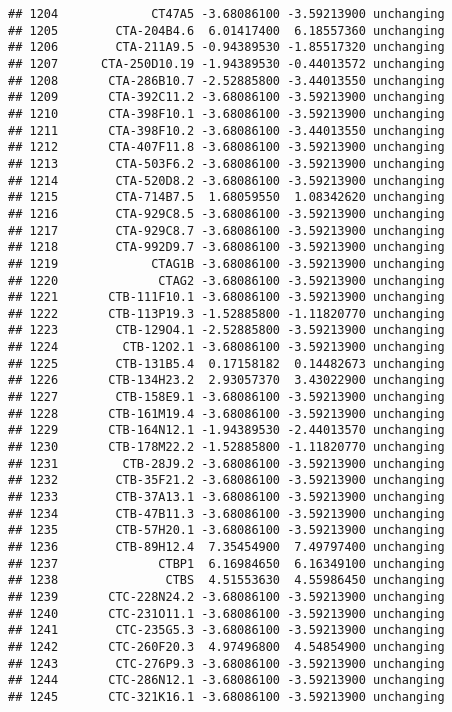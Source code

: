 \documentclass[]{article}
\begin{document}
\begin{verbatim}
## 1204             CT47A5 -3.68086100 -3.59213900 unchanging
## 1205        CTA-204B4.6  6.01417400  6.18557360 unchanging
## 1206        CTA-211A9.5 -0.94389530 -1.85517320 unchanging
## 1207      CTA-250D10.19 -1.94389530 -0.44013572 unchanging
## 1208       CTA-286B10.7 -2.52885800 -3.44013550 unchanging
## 1209       CTA-392C11.2 -3.68086100 -3.59213900 unchanging
## 1210       CTA-398F10.1 -3.68086100 -3.59213900 unchanging
## 1211       CTA-398F10.2 -3.68086100 -3.44013550 unchanging
## 1212       CTA-407F11.8 -3.68086100 -3.59213900 unchanging
## 1213        CTA-503F6.2 -3.68086100 -3.59213900 unchanging
## 1214        CTA-520D8.2 -3.68086100 -3.59213900 unchanging
## 1215        CTA-714B7.5  1.68059550  1.08342620 unchanging
## 1216        CTA-929C8.5 -3.68086100 -3.59213900 unchanging
## 1217        CTA-929C8.7 -3.68086100 -3.59213900 unchanging
## 1218        CTA-992D9.7 -3.68086100 -3.59213900 unchanging
## 1219             CTAG1B -3.68086100 -3.59213900 unchanging
## 1220              CTAG2 -3.68086100 -3.59213900 unchanging
## 1221       CTB-111F10.1 -3.68086100 -3.59213900 unchanging
## 1222       CTB-113P19.3 -1.52885800 -1.11820770 unchanging
## 1223        CTB-129O4.1 -2.52885800 -3.59213900 unchanging
## 1224         CTB-12O2.1 -3.68086100 -3.59213900 unchanging
## 1225        CTB-131B5.4  0.17158182  0.14482673 unchanging
## 1226       CTB-134H23.2  2.93057370  3.43022900 unchanging
## 1227        CTB-158E9.1 -3.68086100 -3.59213900 unchanging
## 1228       CTB-161M19.4 -3.68086100 -3.59213900 unchanging
## 1229       CTB-164N12.1 -1.94389530 -2.44013570 unchanging
## 1230       CTB-178M22.2 -1.52885800 -1.11820770 unchanging
## 1231         CTB-28J9.2 -3.68086100 -3.59213900 unchanging
## 1232        CTB-35F21.2 -3.68086100 -3.59213900 unchanging
## 1233        CTB-37A13.1 -3.68086100 -3.59213900 unchanging
## 1234        CTB-47B11.3 -3.68086100 -3.59213900 unchanging
## 1235        CTB-57H20.1 -3.68086100 -3.59213900 unchanging
## 1236        CTB-89H12.4  7.35454900  7.49797400 unchanging
## 1237              CTBP1  6.16984650  6.16349100 unchanging
## 1238               CTBS  4.51553630  4.55986450 unchanging
## 1239       CTC-228N24.2 -3.68086100 -3.59213900 unchanging
## 1240       CTC-231O11.1 -3.68086100 -3.59213900 unchanging
## 1241        CTC-235G5.3 -3.68086100 -3.59213900 unchanging
## 1242       CTC-260F20.3  4.97496800  4.54854900 unchanging
## 1243        CTC-276P9.3 -3.68086100 -3.59213900 unchanging
## 1244       CTC-286N12.1 -3.68086100 -3.59213900 unchanging
## 1245       CTC-321K16.1 -3.68086100 -3.59213900 unchanging

\end{verbatim}
\end{document}
